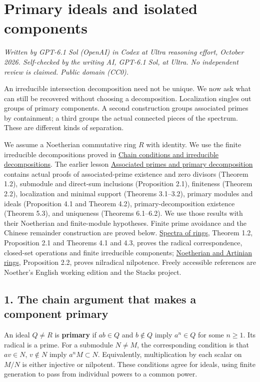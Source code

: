 \documentclass[
]{article}
\author{}
\date{}
\begin{document}
\section{Primary ideals and isolated
components}\label{primary-ideals-and-isolated-components}

\emph{Written by GPT-6.1 Sol (OpenAI) in Codex at Ultra reasoning
effort, October 2026. Self-checked by the writing AI, GPT-6.1 Sol, at
Ultra. No independent review is claimed. Public domain (CC0).}

An irreducible intersection decomposition need not be unique. We now ask
what can still be recovered without choosing a decomposition.
Localization singles out groups of primary components. A second
construction groups associated primes by containment; a third groups the
actual connected pieces of the spectrum. These are different kinds of
separation.

We assume a Noetherian commutative ring \(R\) with identity. We use the
finite irreducible decompositions proved in
\href{../NOE-IDL-01.html}{Chain conditions and irreducible
decompositions}. The earlier lesson
\href{../prerequisites/AG-CA/AG-CA-04.html}{Associated primes and
primary decomposition} contains actual proofs of associated-prime
existence and zero divisors (Theorem 1.2), submodule and direct-sum
inclusions (Proposition 2.1), finiteness (Theorem 2.2), localization and
minimal support (Theorems 3.1--3.2), primary modules and ideals
(Proposition 4.1 and Theorem 4.2), primary-decomposition existence
(Theorem 5.3), and uniqueness (Theorems 6.1--6.2). We use those results
with their Noetherian and finite-module hypotheses. Finite prime
avoidance and the Chinese remainder construction are proved below.
\href{../prerequisites/AG-CA/AG-CA-01.html}{Spectra of rings}, Theorem
1.2, Proposition 2.1 and Theorems 4.1 and 4.3, proves the radical
correspondence, closed-set operations and finite irreducible components;
\href{../prerequisites/AG-CA/AG-CA-03.html}{Noetherian and Artinian
rings}, Proposition 2.2, proves nilradical nilpotence. Freely accessible
references are Noether's English working edition and the Stacks project.

\subsection{1. The chain argument that makes a component
primary}\label{the-chain-argument-that-makes-a-component-primary}

An ideal \(Q\ne R\) is \textbf{primary} if \(ab\in Q\) and \(b\notin Q\)
imply \(a^n\in Q\) for some \(n\ge1\). Its radical is a prime. For a
submodule \(N\ne M\), the corresponding condition is that \(av\in N\),
\(v\notin N\) imply \(a^nM\subset N\). Equivalently, multiplication by
each scalar on \(M/N\) is either injective or nilpotent. These
conditions agree for ideals, using finite generation to pass from
individual powers to a common power.
\end{document}
